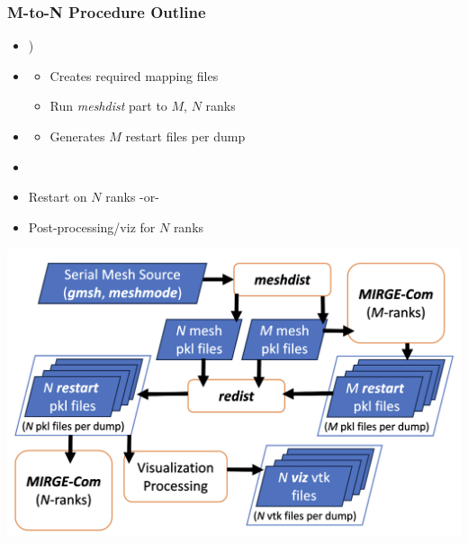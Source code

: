 \begin{frame}\frametitle{M-to-N Procedure Outline}
\begin{minipage}{0.49\textwidth}
\begin{itemize}
\item {)}
\item {\color{lightgray}{Create the target decompositions $M$,$N$}}
  \begin{itemize}
  \color{lightgray}
  \item Creates required mapping files
  \item Run \textit{meshdist} part to $M$, $N$ ranks
  \end{itemize}
\item {}
  \begin{itemize}
    \color{lightgray}
  \item Generates $M$ restart files per dump
  \end{itemize}
\item {}
\item Restart \mirgecom{} on $N$ ranks -or-
\item Post-processing/viz for $N$ ranks
\end{itemize}
\end{minipage}
\hfill
\begin{minipage}{.49\textwidth}
\includegraphics[width=\textwidth]{Figures/mtc/redist_data_flow_full.png}
\end{minipage}
\end{frame}

